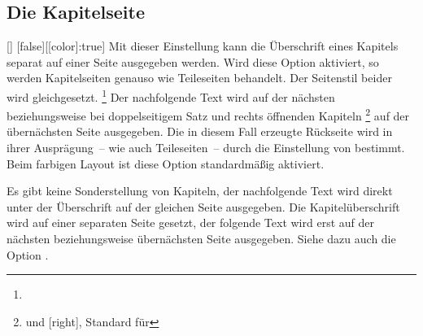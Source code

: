 \documentclass[%
  english,ngerman,%
  headings=optiontoheadandtoc,captions=tableheading,numbers=noenddot,%
  chapterpage,cdfoot,%
]{tudscrman}
\begin{document}
\subsection{Die Kapitelseite}\label{sec:chapter}
\begin{Declaration}{[\PBoolean]}%
  [false][[color]:true]%
\printdeclarationlist%
%
%
%
Mit dieser Einstellung kann die Überschrift eines Kapitels separat auf einer 
Seite ausgegeben werden. Wird diese Option aktiviert, so werden Kapitelseiten 
genauso wie Teileseiten behandelt. Der Seitenstil beider wird gleichgesetzt.%
\footnote{%
}
Der nachfolgende Text wird auf der nächsten beziehungsweise bei doppelseitigem 
Satz und rechts öffnenden Kapiteln%
\footnote{%
   und [right], Standard für 
}
auf der übernächsten Seite ausgegeben. Die in diesem Fall erzeugte Rückseite 
wird in ihrer Ausprägung~-- wie auch Teileseiten~-- durch die Einstellung von 
 bestimmt. Beim farbigen Layout ist diese Option 
standardmäßig aktiviert. \notudscrartcl
%
\begin{values}
\itemfalse
  Es gibt keine Sonderstellung von Kapiteln, der nachfolgende Text wird direkt 
  unter der Überschrift auf der gleichen Seite ausgegeben.
\itemtrue*
  Die Kapitelüberschrift wird auf einer separaten Seite gesetzt, der folgende
  Text wird erst auf der nächsten beziehungsweise übernächsten Seite ausgegeben. 
  Siehe dazu auch die Option .
\end{values}
\end{Declaration}
\end{document}
